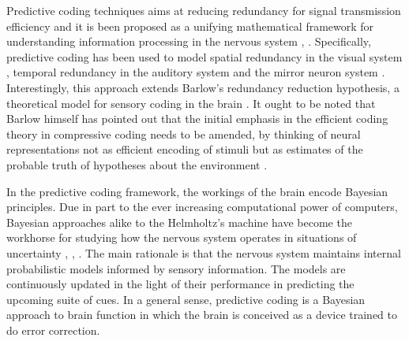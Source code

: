 \documentclass[11pt,twocolumn]{article}
\begin{document}
Predictive coding techniques aims at reducing redundancy for signal transmission efficiency and it is been proposed as a unifying mathematical framework for understanding information processing in the nervous system \citep{Friston:2010}, \citep{huang_predictive_2011}. Specifically, predictive coding has been used to model spatial redundancy in the visual system \citep{srinivasan_predictive_1982}, temporal redundancy in the auditory system \citep{baldeweg_repetition_2006} and the mirror neuron system \citep{kilner_predictive_2007}. Interestingly, this approach extends Barlow's redundancy reduction hypothesis, a theoretical model for sensory coding in the brain \citep{Barlow:1972}. It ought to be noted that Barlow himself has pointed out that the initial emphasis in the efficient coding theory in compressive coding %
needs to be amended, by thinking of neural representations not as efficient encoding of stimuli but as estimates of the probable truth of hypotheses about the environment \citep{barlow_redundancy_2001}. 

In the predictive coding framework, the workings of the brain encode Bayesian principles. 
Due in part to the ever increasing computational power of computers, Bayesian approaches alike to the Helmholtz's machine have become the workhorse for studying how the nervous system operates in situations of uncertainty \citep{rao_predictive_1999}, \citep{knill_bayesian_2004}, \citep{friston_history_2012}. The main rationale is that the nervous system maintains internal probabilistic models informed by sensory information. The models are continuously updated in the light of their performance in predicting the upcoming suite of cues. 
In a general sense, predictive coding is a Bayesian approach to brain function in which the brain is conceived as a device trained to do error correction. 
\end{document}
